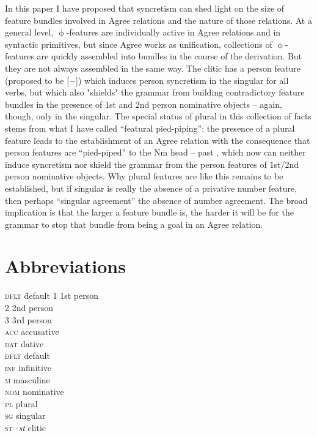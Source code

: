 \documentclass[output=paper]{langscibook}
\begin{document}
In this paper I have proposed that  syncretism can shed light on the size of feature bundles involved in  Agree relations and the nature of those relations. At a general level, $\upphi$-features are individually active in Agree relations and in syntactic primitives, but since Agree works as unification, collections of $\upphi$-features are quickly assembled into bundles in the course of the derivation. But they are not always assembled in the same way. The \stin{} clitic has a person feature (proposed to be [$-$]) which induces person syncretism in the singular for all \stin{} verbs, but which also "shields" the grammar from building contradictory feature bundles in the presence of 1st and 2nd person nominative objects -- again, though, only in the singular. The special status of plural in this collection of facts stems from what I have called ``featural pied-piping'': the presence of a plural feature leads to the establishment of an Agree relation with the consequence that person features are ``pied-piped'' to the Nm head -- past \stin{}, which now can neither induce syncretism nor shield the grammar from the person features of 1st/2nd person nominative objects. Why plural features are like this remains to be established, but if singular is really the absence of a privative number feature, then perhaps ``singular agreement''  the absence of number agreement. The broad implication is that the larger a feature bundle is, the harder it will be for the grammar to stop that bundle from being a goal in an Agree relation.  

\section*{Abbreviations}
\begin{multicols}{3}
\begin{tabbing}
\textsc{dflt}\hspace{.5ex} \= default\kill
\textsc{1}   \> 1st person  \\
\textsc{2}   \> 2nd person \\
\textsc{3}   \> 3rd person \\
\textsc{acc} \> accusative    \\
\textsc{dat} \> dative     \\
\textsc{dflt} \> default    \\
\textsc{inf}  \> infinitive\\
\textsc{m}    \> masculine  \\
\textsc{nom} \> nominative   \\
\textsc{pl}   \> plural     \\
\textsc{sg}   \> singular   \\
\textsc{st}   \> \textit{-st} clitic
\end{tabbing}
\end{multicols}

\printbibliography[heading=subbibliography,notkeyword=this]
\end{document}
